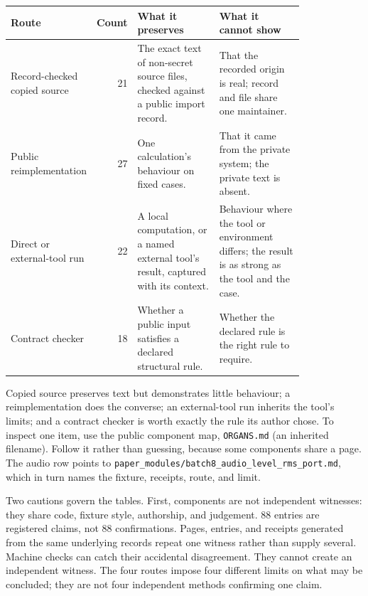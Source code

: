 \documentclass[11pt]{article}
\newcommand{\component}[1]{\nolinkurl{#1}}
\newcommand{\componentcount}{88}
\newcommand{\copiedsourcecount}{21}
\newcommand{\refactorcount}{27}
\newcommand{\runtimecount}{22}
\newcommand{\validatorcount}{18}
\begin{document}
\begin{center}
\small
\begin{tabular}{>{\raggedright\arraybackslash}p{0.20\linewidth}r>{\raggedright\arraybackslash}p{0.30\linewidth}>{\raggedright\arraybackslash}p{0.32\linewidth}}
\toprule
\textbf{Route} & \textbf{Count} & \textbf{What it preserves} & \textbf{What it cannot show} \\
\midrule
Record-checked copied source & \copiedsourcecount & The exact text of non-secret source files, checked against a public import record. & That the recorded origin is real; record and file share one maintainer. \\
Public reimplementation & \refactorcount & One calculation's behaviour on fixed cases. & That it came from the private system; the private text is absent. \\
Direct or external-tool run & \runtimecount & A local computation, or a named external tool's result, captured with its context. & Behaviour where the tool or environment differs; the result is as strong as the tool and the case. \\
Contract checker & \validatorcount & Whether a public input satisfies a declared structural rule. & Whether the declared rule is the right rule to require. \\
\bottomrule
\end{tabular}
\end{center}

Copied source preserves text but demonstrates little behaviour; a
reimplementation does the converse; an external-tool run inherits the tool's
limits; and a contract checker is worth exactly the rule its author chose.
To inspect one item, use the public component map,
\component{ORGANS.md} (an inherited filename). Follow it rather than guessing,
because some components share a page. The audio row points to
\component{paper_modules/batch8_audio_level_rms_port.md}, which in turn names
the fixture, receipts, route, and limit.

Two cautions govern the tables. First, components are not independent
witnesses: they share code, fixture style, authorship, and judgement.
\componentcount{} entries are registered claims, not \componentcount{}
confirmations. Pages, entries, and receipts generated from the same underlying
records repeat one witness rather than supply several. Machine checks can catch
their accidental disagreement. They cannot create an independent witness.
The four routes impose four different limits on what may be concluded; they
are not four independent methods confirming one claim.
\end{document}
